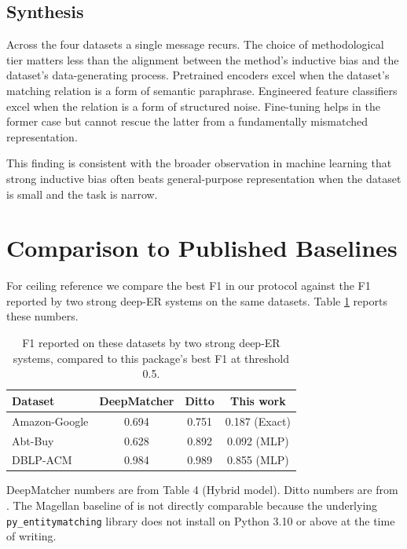 \documentclass[10pt,letterpaper]{article}
\begin{document}
\subsection{Synthesis}

Across the four datasets a single message recurs. The choice of
methodological tier matters less than the alignment between the
method's inductive bias and the dataset's data-generating process.
Pretrained encoders excel when the dataset's matching relation is a
form of semantic paraphrase. Engineered feature classifiers excel when
the relation is a form of structured noise. Fine-tuning helps in the
former case but cannot rescue the latter from a fundamentally
mismatched representation.

This finding is consistent with the broader observation in machine
learning that strong inductive bias often beats general-purpose
representation when the dataset is small and the task is narrow.

\section{Comparison to Published Baselines}
\label{sec:baselines}

For ceiling reference we compare the best F1 in our protocol against
the F1 reported by two strong deep-ER systems on the same datasets.
Table \ref{tab:baselines} reports these numbers.

\begin{table}[t]
\centering
\caption{F1 reported on these datasets by two strong deep-ER systems,
compared to this package's best F1 at threshold 0.5.}
\label{tab:baselines}
\small
\begin{tabular}{lccc}
\toprule
Dataset & DeepMatcher & Ditto & This work \\
\midrule
Amazon-Google & 0.694 & 0.751 & 0.187 (Exact) \\
Abt-Buy       & 0.628 & 0.892 & 0.092 (MLP) \\
DBLP-ACM      & 0.984 & 0.989 & 0.855 (MLP) \\
\bottomrule
\end{tabular}
\end{table}

DeepMatcher numbers are from \citet{mudgal2018} Table 4 (Hybrid
model). Ditto numbers are from \citet{li2020}. The Magellan baseline
of \citet{konda2016} is not directly comparable because the underlying
\texttt{py\_entitymatching} library does not install on Python 3.10 or
above at the time of writing.
\end{document}
